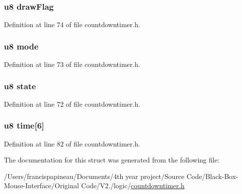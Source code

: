 \hypertarget{structcdtimer_a3e8544bc695992c4f9df78288018341b}{
\subsubsection[{draw\-Flag}]{\setlength{\rightskip}{0pt plus 5cm}u8 {\bf draw\-Flag}}}\label{structcdtimer_a3e8544bc695992c4f9df78288018341b}


\-Definition at line 74 of file countdowntimer.\-h.

\hypertarget{structcdtimer_a7cea6ae40aa46b41e3806213a39718c6}{
\subsubsection[{mode}]{\setlength{\rightskip}{0pt plus 5cm}u8 {\bf mode}}}\label{structcdtimer_a7cea6ae40aa46b41e3806213a39718c6}


\-Definition at line 73 of file countdowntimer.\-h.

\hypertarget{structcdtimer_ad0bc4e4e6e6ffc52d9079b73afd73887}{
\subsubsection[{state}]{\setlength{\rightskip}{0pt plus 5cm}u8 {\bf state}}}\label{structcdtimer_ad0bc4e4e6e6ffc52d9079b73afd73887}


\-Definition at line 72 of file countdowntimer.\-h.

\hypertarget{structcdtimer_a423004d470464f425592df7a003cd838}{
\subsubsection[{time}]{\setlength{\rightskip}{0pt plus 5cm}u8 {\bf time}\mbox{[}6\mbox{]}}}\label{structcdtimer_a423004d470464f425592df7a003cd838}


\-Definition at line 82 of file countdowntimer.\-h.



\-The documentation for this struct was generated from the following file\-:\begin{DoxyCompactItemize}
\item 
/\-Users/francispapineau/\-Documents/4th year project/\-Source Code/\-Black-\/\-Box-\/\-Mouse-\/\-Interface/\-Original Code/\-V2./logic/\hyperlink{countdowntimer_8h}{countdowntimer.\-h}\end{DoxyCompactItemize}
